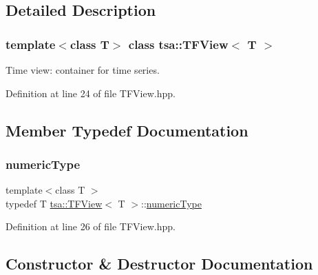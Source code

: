 \subsection{Detailed Description}
\subsubsection*{template$<$class T$>$\newline
class tsa\+::\+T\+F\+View$<$ T $>$}

Time view\+: container for time series. 

Definition at line 24 of file T\+F\+View.\+hpp.



\subsection{Member Typedef Documentation}
\mbox{\label{classtsa_1_1_t_f_view_a9dcd740f5d29edefd0a181917a9c700b}} 
\subsubsection{\texorpdfstring{numeric\+Type}{numericType}}
{\footnotesize\ttfamily template$<$class T $>$ \\
typedef T \hyperlink{classtsa_1_1_t_f_view}{tsa\+::\+T\+F\+View}$<$ T $>$\+::\hyperlink{classtsa_1_1_t_f_view_a9dcd740f5d29edefd0a181917a9c700b}{numeric\+Type}}



Definition at line 26 of file T\+F\+View.\+hpp.



\subsection{Constructor \& Destructor Documentation}
\mbox{\label{classtsa_1_1_t_f_view_a03015be7d08c3aa9ac9fa82210706990}} 
